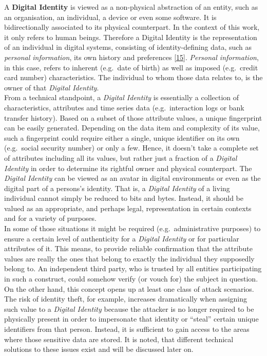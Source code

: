 \documentclass[12pt,english,a4paper,titlepage,cleardoublepage=empty,dottedtoc]{report}
\begin{document}
A \textbf{\protect\hypertarget{def--digital-identity}{}{Digital
Identity}} is viewed as a non-physical abstraction of an entity, such as
an organisation, an individual, a device or even some software. It is
bidirectionally associated to its physical counterpart. In the context
of this work, it only refers to human beings. Therefore a Digital
Identity is the representation of an individual in digital systems,
consisting of identity-defining data, such as \emph{personal
information}, its own history and preferences
{[}\protect\hyperlink{ref-whitepaper_2012_the-value-of-our-digital-identity_definition}{15}{]}.
\emph{Personal information}, in this case, refers to inherent (e.g.~date
of birth) as well as imposed (e.g.~credit card number) characteristics.
The individual to whom those data relates to, is the owner of that
\emph{Digital Identity}.\\
From a technical standpoint, a \emph{Digital Identity} is essentially a
collection of characteristics, attributes and time series data
(e.g.~interaction logs or bank transfer history). Based on a subset of
those attribute values, a unique fingerprint can be easily generated.
Depending on the data item and complexity of its value, such a
fingerprint could require either a single, unique identifier on its own
(e.g.~social security number) or only a few. Hence, it doesn't take a
complete set of attributes including all its values, but rather just a
fraction of a \emph{Digital Identity} in order to determine its rightful
owner and physical counterpart. The \emph{Digital Identity} can be
viewed as an avatar in digital environments or even as the digital part
of a persons's identity. That is, a \emph{Digital Identity} of a living
individual cannot simply be reduced to bits and bytes. Instead, it
should be valued as an appropriate, and perhaps legal, representation in
certain contexts and for a variety of purposes.\\
In some of those situations it might be required (e.g.~administrative
purposes) to ensure a certain level of authenticity for a \emph{Digital
Identity} or for particular attributes of it. This means, to provide
reliable confirmation that the attribute values are really the ones that
belong to exactly the individual they supposedly belong to. An
independent third party, who is trusted by all entities participating in
such a construct, could somehow verify (or vouch for) the subject in
question. On the other hand, this concept opens up at least one class of
attack scenarios. The risk of identity theft, for example, increases
dramatically when assigning such value to a \emph{Digital Identity}
because the attacker is no longer required to be physically present in
order to impersonate that identity or ``steal'' certain unique
identifiers from that person. Instead, it is sufficient to gain access
to the areas where those sensitive data are stored. It is noted, that
different technical solutions to these issues exist and will be
discussed later on.
\end{document}
